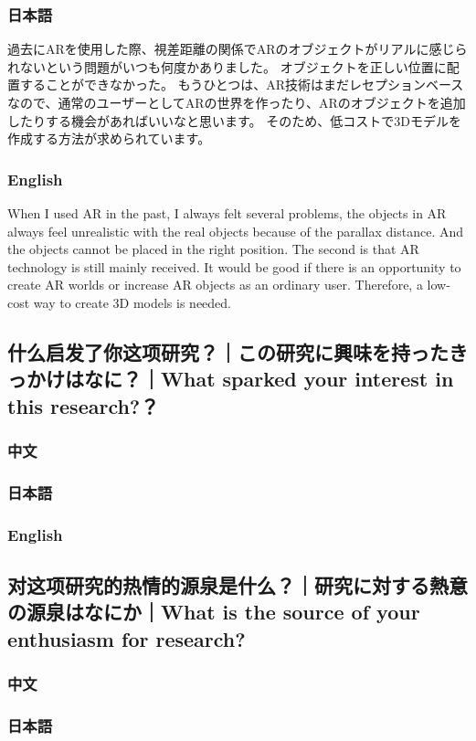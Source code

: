 \documentclass[lang=cn,11pt,a4paper]{elegantpaper}
\begin{document}
\subsubsection{日本語}
過去にARを使用した際、視差距離の関係でARのオブジェクトがリアルに感じられないという問題がいつも何度かありました。 オブジェクトを正しい位置に配置することができなかった。 もうひとつは、AR技術はまだレセプションベースなので、通常のユーザーとしてARの世界を作ったり、ARのオブジェクトを追加したりする機会があればいいなと思います。 そのため、低コストで3Dモデルを作成する方法が求められています。
\subsubsection{English}
When I used AR in the past, I always felt several problems, the objects in AR always feel unrealistic with the real objects because of the parallax distance. And the objects cannot be placed in the right position. The second is that AR technology is still mainly received. It would be good if there is an opportunity to create AR worlds or increase AR objects as an ordinary user. Therefore, a low-cost way to create 3D models is needed.

\subsection{什么启发了你这项研究？｜この研究に興味を持ったきっかけはなに？｜What sparked your interest in this research?？}
\subsubsection{中文}
\subsubsection{日本語}
\subsubsection{English}

\subsection{对这项研究的热情的源泉是什么？｜研究に対する熱意の源泉はなにか｜What is the source of your enthusiasm for research?}
\subsubsection{中文}
\subsubsection{日本語}
\end{document}
